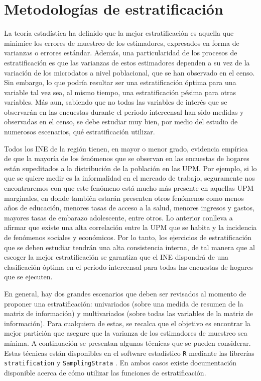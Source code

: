 \documentclass[12pt,spanish,]{book}
\begin{document}
\hypertarget{metodologias-de-estratificacion}{%
\section{Metodologías de estratificación}\label{metodologias-de-estratificacion}}

La teoría estadística ha definido que la mejor estratificación es aquella que minimice los errores de muestreo de los estimadores, expresados en forma de varianzas o errores estándar. Además, una particularidad de los procesos de estratificación es que las varianzas de estos estimadores dependen a su vez de la variación de los microdatos a nivel poblacional, que se han observado en el censo. Sin embargo, lo que podría resultar ser una estratificación óptima para una variable tal vez sea, al mismo tiempo, una estratificación pésima para otras variables. Más aun, sabiendo que no todas las variables de interés que se observarán en las encuestas durante el periodo intercensal han sido medidas y observadas en el censo, se debe estudiar muy bien, por medio del estudio de numerosos escenarios, qué estratificación utilizar.

Todos los INE de la región tienen, en mayor o menor grado, evidencia empírica de que la mayoría de los fenómenos que se observan en las encuestas de hogares están supeditados a la distribución de la población en las UPM. Por ejemplo, si lo que se quiere medir es la informalidad en el mercado de trabajo, seguramente nos encontraremos con que este fenómeno está mucho más presente en aquellas UPM marginales, en donde también estarán presenten otros fenómenos como menos años de educación, menores tasas de acceso a la salud, menores ingresos y gastos, mayores tasas de embarazo adolescente, entre otros. Lo anterior conlleva a afirmar que existe una alta correlación entre la UPM que se habita y la incidencia de fenómenos sociales y económicos. Por lo tanto, los ejercicios de estratificación que se deben estudiar tendrán una alta consistencia interna, de tal manera que al escoger la mejor estratificación se garantiza que el INE dispondrá de una clasificación óptima en el periodo intercensal para todas las encuestas de hogares que se ejecuten.

En general, hay dos grandes escenarios que deben ser revisados al momento de proponer una estratificación: univariados (sobre una medida de resumen de la matriz de información) y multivariados (sobre todas las variables de la matriz de información). Para cualquiera de estas, se recalca que el objetivo es encontrar la mejor partición que asegure que la varianza de los estimadores de muestreo sea mínima. A continuación se presentan algunas técnicas que se pueden considerar. Estas técnicas están disponibles en el software estadístico \texttt{R} mediante las librerías \texttt{stratification} \autocite{Baillargeon_Rivest_2011} y \texttt{SamplingStrata} \autocite{Barcaroli_2014}. En ambos casos existe documentación disponible acerca de cómo utilizar las funciones de estratificación.
\end{document}
